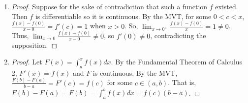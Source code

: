 \documentclass[11pt, letterpaper]{article}
\begin{document}
\thispagestyle{firststyle}


\begin{enumerate}
  \item \begin{proof}
    Suppose for the sake of contradiction that such a function $f$ existed. Then $f$ is differentiable so it is continuous. By the MVT, for some $0 < c < x$, $\frac{f(x) - f(0)}{x - 0} = f'(c) = 1$ when $x > 0$. So, $\lim_{x \to 0^+} \frac{f(x) - f(0)}{x} = 1 \neq 0$. Thus, $\lim_{x \to 0}\frac{f(x) - f(0)}{x - 0} \neq 0$, so $f'(0) \neq 0$, contradicting the supposition.
  \end{proof}

  \item \begin{proof}
    Let $F(x) = \int_a^x f(x) dx$. By the Fundamental Theorem of Calculus 2, $F'(x) = f(x)$ and $F$ is continuous. By the MVT, $\frac{F(b) - F(a)}{b - a} = F'(c) = f(c)$ for some $c \in (a, b)$. That is, $F(b) - F(a) = F(b) = \int_a^b f(x) dx = f(c)(b - a)$.
  \end{proof}
\end{enumerate}
\end{document}
